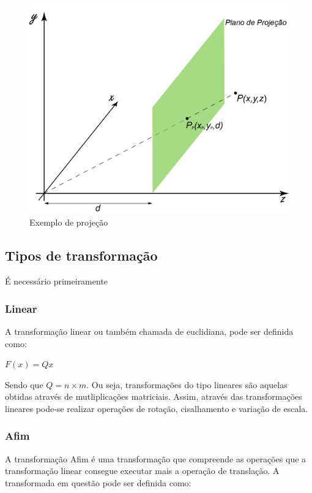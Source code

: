 \documentclass[9pt, a4paper, nofonttune, journal]{IEEEtran}
\begin{document}
\begin{figure}[H] 
\begin{center}
\includegraphics[scale=0.25]{figuras/projection1}
\caption{Exemplo de projeção}
\end{center}
\end{figure}

\subsection{Tipos de transformação}
É necessário primeiramente 
\subsubsection{Linear}
A transformação linear ou também chamada de euclidiana, pode ser definida como:
\begin{center}
$F(x)=Qx$\end{center}
Sendo que $Q=n\times m$.
Ou seja, transformações do tipo lineares são aquelas obtidas através de mutliplicações matriciais.
Assim, através das transformações lineares pode-se realizar operações de rotação, cisalhamento e variação de escala.\cite{CGPPBook1}
\subsubsection{Afim}
A transformação Afim é uma transformação que compreende as operações que a transformação linear
consegue executar mais a operação de translação. A transformada em questão pode ser definida como:
\end{document}
